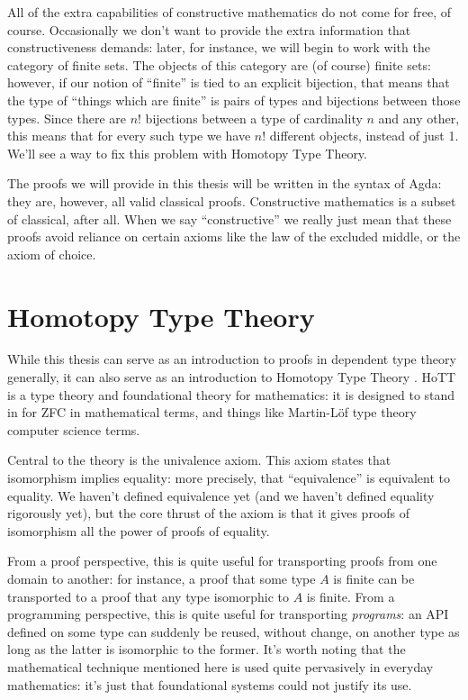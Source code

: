 All of the extra capabilities of constructive mathematics do not come for free,
of course.
Occasionally we don't want to provide the extra information that
constructiveness demands: later, for instance, we will begin to work with the
category of finite sets.
The objects of this category are (of course) finite sets: however, if our notion
of ``finite'' is tied to an explicit bijection, that means that the type of
``things which are finite'' is pairs of types and bijections between those
types. 
Since there are \(n!\) bijections between a type of cardinality \(n\) and any
other, this means that for every such type we have \(n!\) different objects,
instead of just 1.
We'll see a way to fix this problem with Homotopy Type Theory.

The proofs we will provide in this thesis will be written in the syntax of
Agda: they are, however, all valid classical proofs.
Constructive mathematics is a subset of classical, after all.
When we say ``constructive'' we really just mean that these proofs avoid
reliance on certain axioms like the law of the excluded middle, or the axiom of
choice.
\section{Homotopy Type Theory}
While this thesis can serve as an introduction to proofs in dependent type
theory generally, it can also serve as an introduction to Homotopy Type Theory
\citep{hottbook}.
HoTT is a type theory and foundational theory for mathematics: it is designed to
stand in for ZFC in mathematical terms, and things like Martin-Löf type theory
computer science terms.

Central to the theory is the univalence axiom.
This axiom states that isomorphism implies equality: more precisely, that
``equivalence'' is equivalent to equality.
We haven't defined equivalence yet (and we haven't defined equality rigorously
yet), but the core thrust of the axiom is that it gives proofs of isomorphism
all the power of proofs of equality.

From a proof perspective, this is quite useful for transporting proofs from one
domain to another: for instance, a proof that some type \(A\) is finite can be
transported to a proof that any type isomorphic to \(A\) is finite.
From a programming perspective, this is quite useful for transporting
\emph{programs}: an API defined on some type can suddenly be reused, without
change, on another type as long as the latter is isomorphic to the former.
It's worth noting that the mathematical technique mentioned here is used quite
pervasively in everyday mathematics: it's just that foundational systems could
not justify its use.

